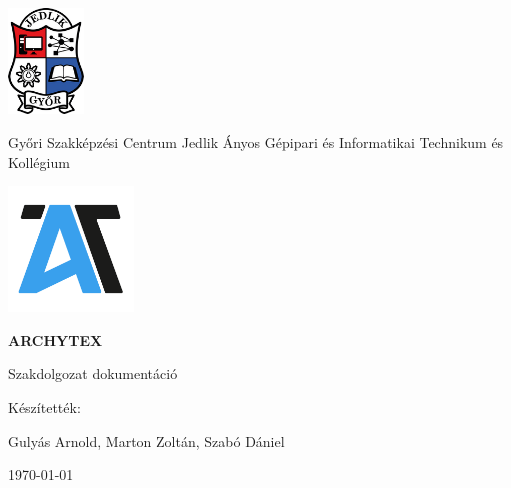 \documentclass[12pt, twoside]{report}
\begin{document}
\begin{titlepage}
  \centering
  \includegraphics[width=0.15\textwidth]{images/jedlik_logo.png}\par\vspace{1cm}
  {\Large Győri Szakképzési Centrum Jedlik Ányos Gépipari és Informatikai Technikum és Kollégium\par}
  \vspace{2cm}
  \includegraphics[width=0.25\textwidth]{images/archytex_logo.png}\par\vspace{1cm}
  {\huge\sffamily\textbf{ARCHYTEX}\par}
  \vspace{1cm}
  {\Large Szakdolgozat dokumentáció\par}
  \vfill
  Készítették:\par
  Gulyás Arnold, Marton Zoltán, Szabó Dániel

  \vfill

  \vfill
  {\large \today\par}
\end{titlepage}



\tableofcontents











\appendix




\end{document}
